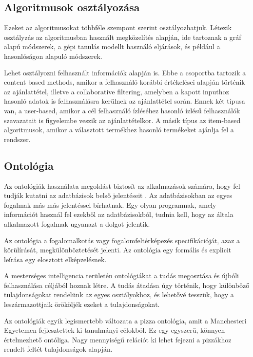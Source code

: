\subsection{Algoritmusok osztályozása}

Ezeket az algoritmusokat többféle szempont szerint osztályozhatjuk. Létezik osztályzás az algoritmusban használt megközelítés alapján, ide tartoznak a gráf alapú módszerek, a gépi tanulás modellt használó eljárások, és például a hasonlóságon alapuló módszerek.

Lehet osztályozni felhasznált információk alapján is. Ebbe a csoportba tartozik a content based methods, amikor a felhasználó korábbi értékelései alapján történik az ajánlattétel, illetve a collaborative filtering, amelyben a kapott inputhoz hasonló adatok is felhasználásra kerülnek az ajánlattétel során. Ennek két típusa van, a user-based, amikor a cél felhasználó ízléséhez hasonló ízlésű felhasználók szavazatait is figyelembe veszik az ajánlattételkor. A másik típus az item-based algoritmusok, amikor a választott termékhez hasonló termékeket ajánlja fel a rendszer.

\subsection{Ontológia}

Az ontológiák használata megoldást biztosít az alkalmazások számára, hogy fel tudják kutatni az adatbázisok belső jelentéseit \cite{owl}. Az adatbázisokban az egyes fogalmak más-más jelentéssel bírhatnak. Egy olyan programnak, amely információt használ fel ezekből az adatbázisokból, tudnia kell, hogy az általa alkalmazott fogalmak ugyanazt a dolgot jelentik.

Az ontológia a fogalomalkotás vagy fogalomfeltérképezés specifikációját, azaz a körülírását, megkülönböztetését jelenti. Az ontológia egy formális és explicit leírása egy elosztott elképzelésnek. 

A mesterséges intelligencia területén ontológiákat a tudás megosztása és újbóli felhasználása céljából hoznak létre. A tudás átadása úgy történik, hogy különböző tulajdonságokat rendelünk az egyes osztályokhoz, és lehetővé tesszük, hogy a leszármazottjaik örököljék ezeket a tulajdonságokat.

Az ontológiák egyik legismertebb változata a pizza ontológia, amit a Manchesteri Egyetemen fejlesztettek ki tanulmányi célokból. Ez egy egyszerű, könnyen értelmezhető ontóliga. Nagy mennyiségű relációt ki lehet fejezni a pizzákhoz rendelt feltét tulajdonságok alapján.

